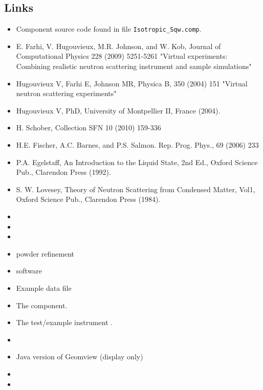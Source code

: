 \subsection*{Links}
\begin{itemize}
  \item Component source code found in file \texttt{Isotropic\_Sqw.comp}.
  \item E. Farhi, V. Hugouvieux, M.R. Johnson, and W. Kob, Journal of Computational Physics 228 (2009) 5251-5261 "Virtual experiments: Combining realistic neutron scattering instrument and sample simulations"
  \item Hugouvieux V, Farhi E, Johnson MR, Physica B, 350 (2004) 151 "Virtual neutron scattering experiments"
  \item Hugouvieux V, PhD, University of Montpellier II, France (2004).
  \item H. Schober, Collection SFN 10 (2010) 159-336
  \item H.E. Fischer, A.C. Barnes, and P.S. Salmon. Rep. Prog. Phys., 69 (2006) 233
  \item P.A. Egelstaff, An Introduction to the Liquid State, 2nd Ed., Oxford Science Pub., Clarendon Press (1992).
  \item S. W. Lovesey, Theory of Neutron Scattering from Condensed Matter, Vol1, Oxford Science Pub., Clarendon Press (1984).
  \item {}
  \item {}
  \item {}
  \item {} powder refinement
  \item {} software
  \item Example data file 
  \item The  component.
  \item The test/example instrument .
  \item {}
  \item Java version of Geomview (display only) 
  \item {}
  \item {}
\end{itemize}
